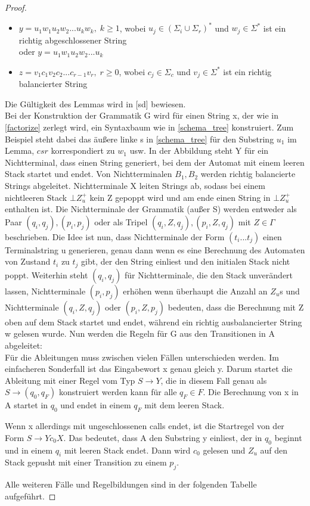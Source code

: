 \begin{proof}
\begin{lemma}
\begin{itemize}
\item
$y=u_1w_1u_2w_2...u_kw_k, \; k \geq 1$, wobei $u_j \in (\Sigma_i \cup \Sigma_r)^*$ und $w_j \in \Sigma^*$ ist ein richtig abgeschlossener String \\
oder $y=u_1w_1u_2w_2...u_k$
\item
$z=v_1c_1v_2c_2...c_{r-1}v_r, \; r\geq 0$, wobei $c_j \in \Sigma_c$ und $v_j \in \Sigma^*$ ist ein richtig balancierter String
\end{itemize}
\begin{figure}
\label{schema_tree}
\end{figure}
\end{lemma}
Die Gültigkeit des Lemmas wird in [sd] bewiesen.\\
Bei der Konstruktion der Grammatik G wird für einen String x, der wie in \autoref{factorize} zerlegt wird, ein Syntaxbaum wie in \autoref{schema_tree}  konstruiert. Zum Beispiel steht dabei das äußere linke s in \autoref{schema_tree} für den Substring $u_1$ im Lemma, $csr$ korrespondiert zu $w_1$ usw. 
In der Abbildung steht Y für ein Nichtterminal, dass einen String generiert, bei dem der Automat mit einem leeren Stack startet und endet.
Von Nichtterminalen $B_1, B_2$ werden richtig balancierte Strings abgeleitet. Nichtterminale X leiten Strings ab, sodass bei einem nichtleeren Stack $\bot Z_u^+$ kein Z gepoppt wird und am ende einen String in $\bot Z_u^+$ enthalten ist. Die Nichtterminale der Grammatik (außer S) werden entweder als Paar $(q_i, q_j) , (p_i, p_j)$ oder als Tripel $(q_i, Z, q_j), (p_i, Z, q_j)$ mit $Z \in \Gamma$ beschrieben. Die Idee ist nun, dass Nichtterminale der Form $(t_i...t_j)$ einen Terminalstring u generieren, genau dann wenn es eine Berechnung des Automaten  von Zustand $t_i$ zu $t_j$ gibt, der den String einliest und den initialen Stack nicht poppt. Weiterhin steht $(q_i, q_j)$ für Nichtterminale, die den Stack unverändert lassen, Nichtterminale $(p_i, p_j)$ erhöhen wenn überhaupt die Anzahl an $Z_u$s und Nichtterminale $(q_i, Z, q_j)$ oder $(p_i, Z, p_j)$ bedeuten, dass die Berechnung mit Z oben auf dem Stack startet und endet, während ein richtig ausbalancierter String w gelesen wurde. Nun werden die Regeln für G aus den Transitionen in A abgeleitet: \\
Für die Ableitungen muss zwischen vielen Fällen unterschieden werden. 
Im einfacheren Sonderfall ist das Eingabewort x genau gleich y. Darum startet die Ableitung mit einer Regel vom Typ $S \rightarrow Y$, die in diesem Fall genau als $S \rightarrow (q_0, q_F)$ konstruiert werden kann für alle $q_F \in F$. Die Berechnung von x in A startet in $q_0$ und endet in einem $q_F$ mit dem leeren Stack. 

Wenn x allerdings mit ungeschlossenen calls endet, ist die Startregel von der Form $S \rightarrow Yc_0X.$ Das bedeutet, dass A den Substring y einliest, der in $q_0$ beginnt und in einem $q_i$ mit leeren Stack endet. Dann wird $c_0$ gelesen und $Z_u$ auf den Stack gepusht mit einer Transition zu einem $p_j$. 




Alle weiteren Fälle und Regelbildungen sind in der folgenden Tabelle aufgeführt.
\end{proof}